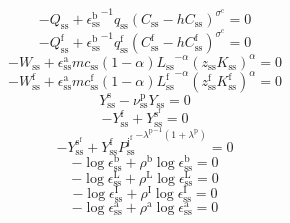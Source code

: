 \begin{equation}
-Q_\mathrm{ss} + {\epsilon^{\mathrm{b}}_\mathrm{ss}}^{-1} {q_\mathrm{ss}} {\left(C_\mathrm{ss} - {h} {C_\mathrm{ss}}\right)^{\sigma^{\mathrm{c}}}} = 0
\end{equation}
\begin{equation}
-Q^{\mathrm{f}}_\mathrm{ss} + {\epsilon^{\mathrm{b}}_\mathrm{ss}}^{-1} {q^{\mathrm{f}}_\mathrm{ss}} {\left(C^{\mathrm{f}}_\mathrm{ss} - {h} {C^{\mathrm{f}}_\mathrm{ss}}\right)^{\sigma^{\mathrm{c}}}} = 0
\end{equation}
\begin{equation}
-W_\mathrm{ss} + {\epsilon^{\mathrm{a}}_\mathrm{ss}} {{m\!c}_\mathrm{ss}} \left(1 - \alpha\right) {{L_\mathrm{ss}}^{-\alpha}} {\left({z_\mathrm{ss}} {K_\mathrm{ss}}\right)^{\alpha}} = 0
\end{equation}
\begin{equation}
-W^{\mathrm{f}}_\mathrm{ss} + {\epsilon^{\mathrm{a}}_\mathrm{ss}} {{m\!c}^{\mathrm{f}}_\mathrm{ss}} \left(1 - \alpha\right) {{L^{\mathrm{f}}_\mathrm{ss}}^{-\alpha}} {\left({z^{\mathrm{f}}_\mathrm{ss}} {K^{\mathrm{f}}_\mathrm{ss}}\right)^{\alpha}} = 0
\end{equation}
\begin{equation}
Y^{\mathrm{s}}_\mathrm{ss} - {\nu^{\mathrm{p}}_\mathrm{ss}} {Y_\mathrm{ss}} = 0
\end{equation}
\begin{equation}
-Y^{\mathrm{f}}_\mathrm{ss} + Y^{\mathrm{s}^{\mathrm{f}}}_\mathrm{ss} = 0
\end{equation}
\begin{equation}
-Y^{\mathrm{s}^{\mathrm{f}}}_\mathrm{ss} + {Y^{\mathrm{f}}_\mathrm{ss}} {{P^{\mathrm{j}^{\mathrm{f}}}_\mathrm{ss}}^{-{\lambda^{\mathrm{p}}}^{-1} \left(1 + \lambda^{\mathrm{p}}\right)}} = 0
\end{equation}
\begin{equation}
-\log{\epsilon^{\mathrm{b}}_\mathrm{ss}} + {\rho^{\mathrm{b}}} {\log{\epsilon^{\mathrm{b}}_\mathrm{ss}}} = 0
\end{equation}
\begin{equation}
-\log{\epsilon^{\mathrm{L}}_\mathrm{ss}} + {\rho^{\mathrm{L}}} {\log{\epsilon^{\mathrm{L}}_\mathrm{ss}}} = 0
\end{equation}
\begin{equation}
-\log{\epsilon^{\mathrm{I}}_\mathrm{ss}} + {\rho^{\mathrm{I}}} {\log{\epsilon^{\mathrm{I}}_\mathrm{ss}}} = 0
\end{equation}
\begin{equation}
-\log{\epsilon^{\mathrm{a}}_\mathrm{ss}} + {\rho^{\mathrm{a}}} {\log{\epsilon^{\mathrm{a}}_\mathrm{ss}}} = 0
\end{equation}
